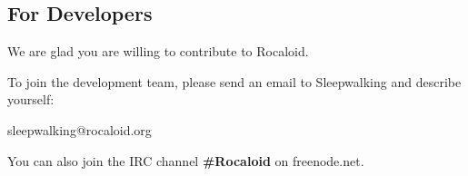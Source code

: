 \subsection{For Developers}\indent

        We are glad you are willing to contribute to Rocaloid.
        
        To join the development team, please send an email to Sleepwalking and describe yourself:
        
        \bigskip
        
        sleepwalking@rocaloid.org
        
        \bigskip
        
        You can also join the IRC channel \textbf{\#Rocaloid} on freenode.net.

